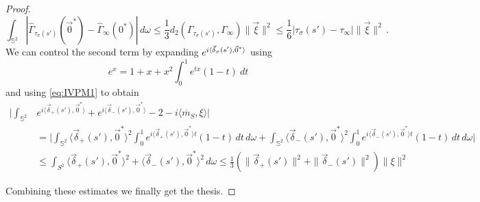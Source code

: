\documentclass[10pt,a4paper]{amsart}
\DeclarePairedDelimiter{\scal}{\langle}{\rangle}
\newcommand\vxi{{\vec \xi}}
\begin{document}
\begin{proof}
\[
 \int_{\mathds S^2} \left| \widehat \Gamma_{\tau_\sigma(s')}(\vec 0^*)  - \widehat \Gamma_{\infty}(0^*)\right|
 \, d\omega \leq \frac 1 3 d_2(\Gamma_{\tau_\sigma(s')}, \Gamma_\infty)\|\vxi\|^2 \leq \frac 1 6 |\tau_\sigma(s') - 
 \tau_\infty|\|\vxi\|^2 \, .
\]
We can control the second term by expanding $e^{i\scal{\vec \delta_\sigma(s'),\vec 0^*}}$ using 
\begin{equation*}
e^{x} = 1 + x + x^2\int_0^1 e^{tx}(1 - t) \ dt
\end{equation*}
and using \eqref{eq:IVPM1} to obtain
\begin{align*}
\bigg|\int_{\mathds
S^2} &e^{i\langle\vec \delta_+(s'),\vec 0^*\rangle} + e^{i\langle\vec \delta_-(s'),\vec 0^*\rangle}
-2 - i\langle \dot{m_S}, \xi\rangle \bigg|
\\
&=
\bigg|
\int_{\mathds S^2} \langle\vec \delta_+(s'),\vec 0^*\rangle^2 \int_0^1 e^{i\langle\vec \delta_+(s'),\vec 0^*\rangle t} 
(1 - 
t)\, dt \, d\omega + 
\int_{\mathds S^2} \langle\vec \delta_-(s'),\vec 0^*\rangle^2\int_0^1 e^{i\langle\vec \delta_-(s'),\vec 0^*\rangle t} 
(1 - t)\, 
dt \, d\omega \bigg|
\\
&\leq 
\int_{S^2} \langle\vec \delta_+(s'),\vec 0^*\rangle^2 + \langle\vec \delta_-(s'),\vec 0^*\rangle^2 \, d\omega 
\leq
\frac 1 3 \left(\|\vec \delta_+(s')\|^2  + \|\vec \delta_-(s')\|^2\right) \|\xi\|^2 
\end{align*}

Combining these estimates we finally get the thesis.
\end{proof}
\end{document}
